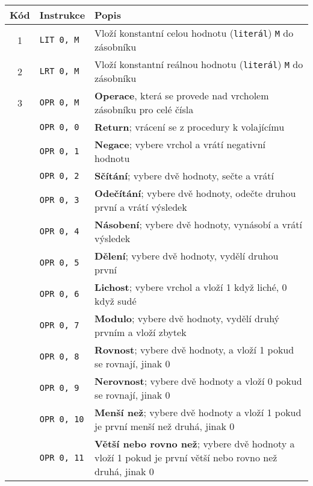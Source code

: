 \documentclass[
12pt,
a4paper,
pdftex,
czech
]{report}
\begin{document}
\begin{table}[]
\centering
\caption{Instrukce}
\label{instrukce}
\begin{longtable}{|c|l|p{10cm}|}
\hline
		Kód & Instrukce & Popis \\
\hline\hline
\rule{0pt}{3ex}1 & \texttt{LIT 0, M} & Vloží konstantní celou hodnotu (\texttt{literál}) \texttt{M} do zásobníku \\ \hline
\rule{0pt}{3ex}2 & \texttt{LRT 0, M} & Vloží konstantní reálnou hodnotu (\texttt{literál}) \texttt{M} do zásobníku \\ \hline
\rule{0pt}{3ex}3 & \texttt{OPR 0, M} & \textbf{Operace}, která se provede nad vrcholem zásobníku pro celé čísla \\ \hline
\rule{0pt}{3ex} & \texttt{OPR 0, 0} & \textbf{Return}; vrácení se z procedury k volajícímu \\ \hline
\rule{0pt}{3ex} & \texttt{OPR 0, 1} & \textbf{Negace}; vybere vrchol a vrátí negativní hodnotu \\ \hline
\rule{0pt}{3ex} & \texttt{OPR 0, 2} & \textbf{Sčítání}; vybere dvě hodnoty, sečte a vrátí \\ \hline
\rule{0pt}{3ex} & \texttt{OPR 0, 3} & \textbf{Odečítání}; vybere dvě hodnoty, odečte druhou první a vrátí výsledek \\ \hline
\rule{0pt}{3ex} & \texttt{OPR 0, 4} & \textbf{Násobení}; vybere dvě hodnoty, vynásobí a vrátí výsledek \\ \hline
\rule{0pt}{3ex} & \texttt{OPR 0, 5} & \textbf{Dělení}; vybere dvě hodnoty, vydělí druhou první \\ \hline
\rule{0pt}{3ex} & \texttt{OPR 0, 6} & \textbf{Lichost}; vybere vrchol a vloží 1 když liché, 0 když sudé \\ \hline
\rule{0pt}{3ex} & \texttt{OPR 0, 7} & \textbf{Modulo}; vybere dvě hodnoty, vydělí druhý prvním a vloží zbytek \\ \hline
\rule{0pt}{3ex} & \texttt{OPR 0, 8} & \textbf{Rovnost}; vybere dvě hodnoty, a vloží 1 pokud se rovnají, jinak 0 \\ \hline
\rule{0pt}{3ex} & \texttt{OPR 0, 9} & \textbf{Nerovnost}; vybere dvě hodnoty a vloží 0 pokud se rovnají, jinak 0 \\ \hline
\rule{0pt}{3ex} & \texttt{OPR 0, 10} & \textbf{Menší než}; vybere dvě hodnoty a vloží 1 pokud je první menší než druhá, jinak 0 \\ \hline
\rule{0pt}{3ex} & \texttt{OPR 0, 11} & \textbf{Větší nebo rovno než}; vybere dvě hodnoty a vloží 1 pokud je první větší nebo rovno než druhá, jinak 0 \\ \hline

\end{longtable}
\end{table}
\end{document}
